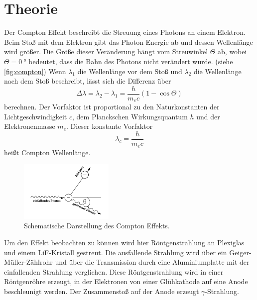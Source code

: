 \section{Theorie}
\label{sec:Theorie}




Der Compton Effekt beschreibt die Streuung eines Photons an einem Elektron.
Beim Stoß mit dem Elektron gibt das Photon Energie ab und dessen Wellenlänge wird größer.
Die Größe dieser Veränderung hängt vom Streuwinkel $\Theta$ ab, wobei $\Theta=\SI{0}{\degree}$ bedeutet, dass die Bahn des Photons nicht verändert wurde. (siehe \autoref{fig:compton})
Wenn $\lambda_1$ die Wellenlänge vor dem Stoß und $\lambda_2$ die Wellenlänge nach dem Stoß beschreibt, lässt sich die Differenz über
\begin{equation}
    \Delta \lambda = \lambda_2 - \lambda_1 = \frac{h}{m_e c}(1-\cos \Theta)
    \label{eq:differenz}
\end{equation}
berechnen.
Der Vorfaktor ist proportional zu den Naturkonstanten der Lichtgeschwindigkeit $c$, dem Planckschen Wirkungsquantum $h$ und der Elektronenmasse $m_e$.
Dieser konstante Vorfaktor 
\begin{equation}
    \lambda_c = \frac{h}{m_e c}
    \label{eq:compton-wellenlänge}
\end{equation}
heißt Compton Wellenlänge.

\begin{figure}
    \centering
    \includegraphics[width=0.4\textwidth]{images/bild_1.png}
    \caption{Schematische Darstellung des Compton Effekts.\cite{V603}}
    \label{fig:compton}
\end{figure}

Um den Effekt beobachten zu können wird hier Röntgenstrahlung an Plexiglas und einem LiF-Kristall gestreut. 
Die ausfallende Strahlung wird über ein Geiger-Müller-Zählrohr und über die Transmission durch eine Aluminiumplatte mit der einfallenden Strahlung verglichen.
Diese Röntgenstrahlung wird in einer Röntgenröhre erzeugt, in der Elektronen von einer Glühkathode auf eine Anode beschleunigt werden. 
Der Zusammenstoß auf der Anode erzeugt $\gamma$-Strahlung.

